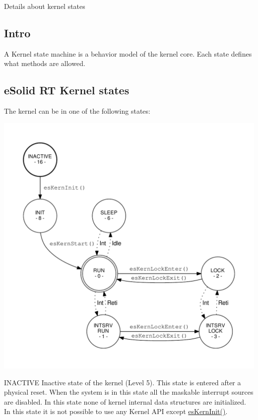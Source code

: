 Details about kernel states

\par
\par
\par
\hypertarget{states_states_intro}{}\subsection{Intro}\label{states_states_intro}
A Kernel state machine is a behavior model of the kernel core. Each state defines what methods are allowed.\hypertarget{states_states_fsm}{}\subsection{e\-Solid R\-T Kernel states}\label{states_states_fsm}
The kernel can be in one of the following states\-: \begin{center}

\begin{DoxyImageNoCaption}
  \mbox{\includegraphics[width=\textwidth,height=\textheight/2,keepaspectratio=true]{dot_inline_dotgraph_1}}
\end{DoxyImageNoCaption}
\end{center}
 \begin{DoxyParagraph}{I\-N\-A\-C\-T\-I\-V\-E}
Inactive state of the kernel (Level 5). This state is entered after a physical reset. When the system is in this state all the maskable interrupt sources are disabled. In this state none of kernel internal data structures are initialized. In this state it is not possible to use any Kernel A\-P\-I except \hyperlink{group__kern__intf_ga9e9ff699d62d6035cd51121bb3140704}{es\-Kern\-Init()}.
\end{DoxyParagraph}
